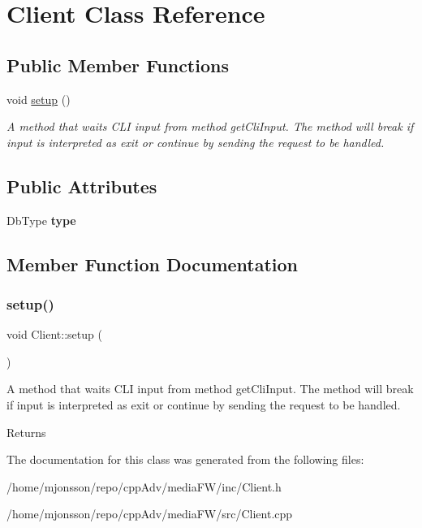 \hypertarget{classClient}{}\section{Client Class Reference}
\label{classClient}
\subsection*{Public Member Functions}
\begin{DoxyCompactItemize}
\item 
void \hyperlink{classClient_a33b0b1f7391689c68fa125549e8c5dcc}{setup} ()
\begin{DoxyCompactList}\small\item\em A method that waits C\+LI input from method get\+Cli\+Input. The method will break if input is interpreted as exit or continue by sending the request to be handled. \end{DoxyCompactList}\end{DoxyCompactItemize}
\subsection*{Public Attributes}
\begin{DoxyCompactItemize}
\item 
\mbox{\label{classClient_a4c99f07fc4be08870e1067ba876e08fb}} 
Db\+Type {\bfseries type}
\end{DoxyCompactItemize}


\subsection{Member Function Documentation}
\mbox{\label{classClient_a33b0b1f7391689c68fa125549e8c5dcc}} 
\subsubsection{\texorpdfstring{setup()}{setup()}}
{\footnotesize\ttfamily void Client\+::setup (\begin{DoxyParamCaption}{ }\end{DoxyParamCaption})}



A method that waits C\+LI input from method get\+Cli\+Input. The method will break if input is interpreted as exit or continue by sending the request to be handled. 

\begin{DoxyReturn}{Returns}

\end{DoxyReturn}


The documentation for this class was generated from the following files\+:\begin{DoxyCompactItemize}
\item 
/home/mjonsson/repo/cpp\+Adv/media\+F\+W/inc/Client.\+h\item 
/home/mjonsson/repo/cpp\+Adv/media\+F\+W/src/Client.\+cpp\end{DoxyCompactItemize}
